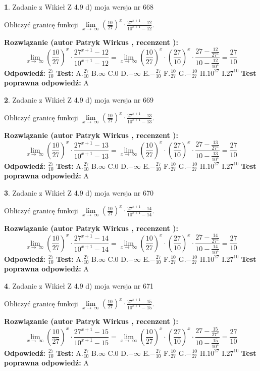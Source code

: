 \documentclass[12pt, a4paper]{article}
\theoremstyle{definition} %
\newtheorem{zad}{}
\newcommand{\zadStart}[1]{\begin{zad}#1\newline}
\newcommand{\zadStop}{\end{zad}}
\newcommand{\rozwStart}[2]{\noindent \textbf{Rozwiązanie (autor #1 , recenzent #2): }\newline}
\newcommand{\rozwStop}{\newline}
\newcommand{\odpStart}{\noindent \textbf{Odpowiedź:}\newline}
\newcommand{\odpStop}{\newline}
\newcommand{\testStart}{\noindent \textbf{Test:}\newline}
\newcommand{\testStop}{\newline}
\newcommand{\kluczStart}{\noindent \textbf{Test poprawna odpowiedź:}\newline}
\newcommand{\kluczStop}{\newline}
\begin{document}
\zadStart{Zadanie z Wikieł Z 4.9 d) moja wersja nr 668}


Obliczyć granicę funkcji  $\lim\limits_{x\to\ \infty}(\frac{10}{27})^{x}\cdot\frac{27^{x+1}-12}{10^{x+1}-12}$.
\zadStop
\rozwStart{Patryk Wirkus}{}
$$\lim\limits_{x\to\ \infty}(\frac{10}{27})^{x}\cdot\frac{27^{x+1}-12}{10^{x+1}-12}=\lim\limits_{x\to\ \infty}(\frac{10}{27})^{x}\cdot(\frac{27}{10})^{x} \cdot \frac{27-\frac{12}{27^{x}}}{10-\frac{12}{10^{x}}} = \frac{27}{10}$$
\rozwStop
\odpStart
$\frac{27}{10}$
\odpStop
\testStart
A.$\frac{27}{10}$ B.$\infty$ C.$0$ D.$-\infty$ E.$-\frac{27}{10}$
F.$\frac{10}{27}$ G.$-\frac{10}{27}$
H.$10^{27}$
I.$27^{10}$
\testStop
\kluczStart
A
\kluczStop



\zadStart{Zadanie z Wikieł Z 4.9 d) moja wersja nr 669}


Obliczyć granicę funkcji  $\lim\limits_{x\to\ \infty}(\frac{10}{27})^{x}\cdot\frac{27^{x+1}-13}{10^{x+1}-13}$.
\zadStop
\rozwStart{Patryk Wirkus}{}
$$\lim\limits_{x\to\ \infty}(\frac{10}{27})^{x}\cdot\frac{27^{x+1}-13}{10^{x+1}-13}=\lim\limits_{x\to\ \infty}(\frac{10}{27})^{x}\cdot(\frac{27}{10})^{x} \cdot \frac{27-\frac{13}{27^{x}}}{10-\frac{13}{10^{x}}} = \frac{27}{10}$$
\rozwStop
\odpStart
$\frac{27}{10}$
\odpStop
\testStart
A.$\frac{27}{10}$ B.$\infty$ C.$0$ D.$-\infty$ E.$-\frac{27}{10}$
F.$\frac{10}{27}$ G.$-\frac{10}{27}$
H.$10^{27}$
I.$27^{10}$
\testStop
\kluczStart
A
\kluczStop



\zadStart{Zadanie z Wikieł Z 4.9 d) moja wersja nr 670}


Obliczyć granicę funkcji  $\lim\limits_{x\to\ \infty}(\frac{10}{27})^{x}\cdot\frac{27^{x+1}-14}{10^{x+1}-14}$.
\zadStop
\rozwStart{Patryk Wirkus}{}
$$\lim\limits_{x\to\ \infty}(\frac{10}{27})^{x}\cdot\frac{27^{x+1}-14}{10^{x+1}-14}=\lim\limits_{x\to\ \infty}(\frac{10}{27})^{x}\cdot(\frac{27}{10})^{x} \cdot \frac{27-\frac{14}{27^{x}}}{10-\frac{14}{10^{x}}} = \frac{27}{10}$$
\rozwStop
\odpStart
$\frac{27}{10}$
\odpStop
\testStart
A.$\frac{27}{10}$ B.$\infty$ C.$0$ D.$-\infty$ E.$-\frac{27}{10}$
F.$\frac{10}{27}$ G.$-\frac{10}{27}$
H.$10^{27}$
I.$27^{10}$
\testStop
\kluczStart
A
\kluczStop



\zadStart{Zadanie z Wikieł Z 4.9 d) moja wersja nr 671}


Obliczyć granicę funkcji  $\lim\limits_{x\to\ \infty}(\frac{10}{27})^{x}\cdot\frac{27^{x+1}-15}{10^{x+1}-15}$.
\zadStop
\rozwStart{Patryk Wirkus}{}
$$\lim\limits_{x\to\ \infty}(\frac{10}{27})^{x}\cdot\frac{27^{x+1}-15}{10^{x+1}-15}=\lim\limits_{x\to\ \infty}(\frac{10}{27})^{x}\cdot(\frac{27}{10})^{x} \cdot \frac{27-\frac{15}{27^{x}}}{10-\frac{15}{10^{x}}} = \frac{27}{10}$$
\rozwStop
\odpStart
$\frac{27}{10}$
\odpStop
\testStart
A.$\frac{27}{10}$ B.$\infty$ C.$0$ D.$-\infty$ E.$-\frac{27}{10}$
F.$\frac{10}{27}$ G.$-\frac{10}{27}$
H.$10^{27}$
I.$27^{10}$
\testStop
\kluczStart
A
\kluczStop
\end{document}
